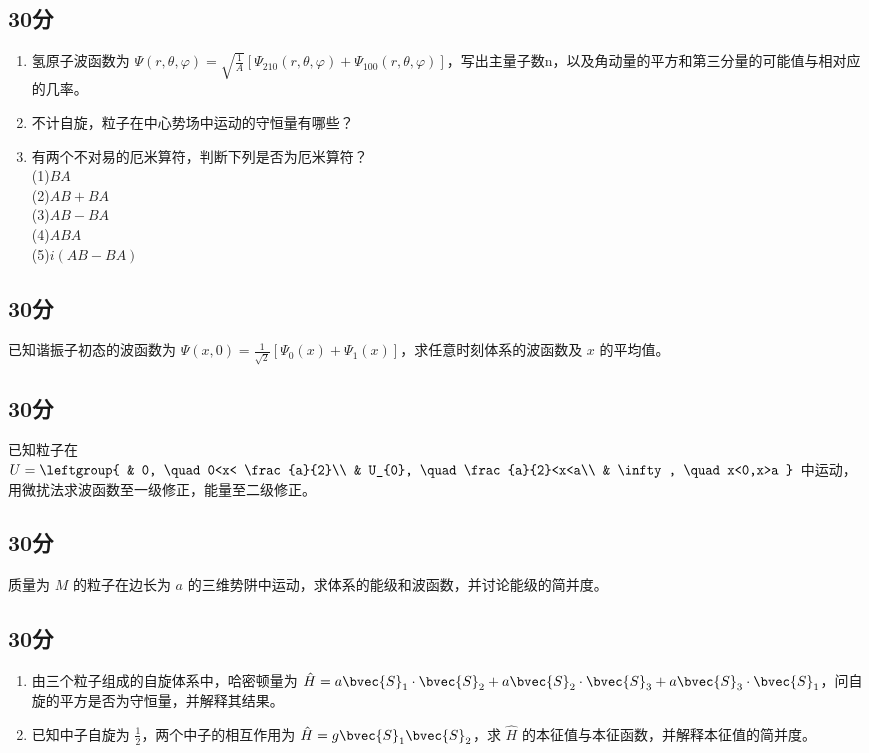 
\subsection{30分}
\begin{enumerate}
\item 氢原子波函数为 $\displaystyle \varPsi (r,\theta,\varphi)=\sqrt{\frac{1}{A}}[\varPsi_{210}(r,\theta,\varphi)+\varPsi_{100}(r,\theta,\varphi)]$，写出主量子数n，以及角动量的平方和第三分量的可能值与相对应的几率。
\item 不计自旋，粒子在中心势场中运动的守恒量有哪些？
\item 有两个不对易的厄米算符，判断下列是否为厄米算符？\\
(1)$BA$\\(2)$AB+BA$\\(3)$AB-BA$\\(4)$ABA$\\(5)$i(AB-BA)$
\end{enumerate}
\subsection{30分}
已知谐振子初态的波函数为 $\displaystyle \varPsi(x,0)=\frac{1}{\sqrt{2}}[\varPsi_{0}(x)+\varPsi_{1}(x)]$，求任意时刻体系的波函数及 $x$ 的平均值。
\subsection{30分}
已知粒子在 $U=\leftgroup{
    & 0, \quad 0<x< \frac{a}{2}\\
    & U_{0}, \quad \frac{a}{2}<x<a\\
    & \infty, \quad x<0,x>a
}$ 中运动，用微扰法求波函数至一级修正，能量至二级修正。
\subsection{30分}
质量为 $M$ 的粒子在边长为 $a$ 的三维势阱中运动，求体系的能级和波函数，并讨论能级的简并度。
\subsection{30分}
\begin{enumerate}
\item 由三个粒子组成的自旋体系中，哈密顿量为 $\hat {H}=a\bvec{S}_1\cdot\bvec{S}_2+a\bvec{S}_2\cdot\bvec{S}_3+a\bvec{S}_3\cdot\bvec{S}_1$，问自旋的平方是否为守恒量，并解释其结果。
\item 已知中子自旋为 $\frac{1}{2}$，两个中子的相互作用为 $\hat {H}=g\bvec{S}_1\bvec{S}_2$，求 $\hat {H}$ 的本征值与本征函数，并解释本征值的简并度。
\end{enumerate}